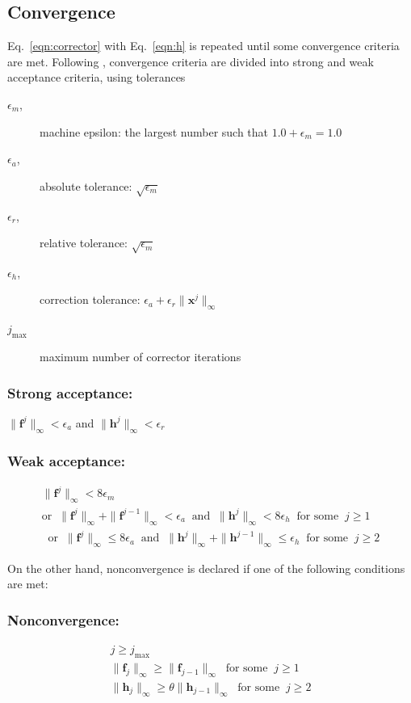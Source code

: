\documentclass[10pt,openany,twoside]{book}
\numberwithin{equation}{section}   %
\newcommand{\Vector}[1]{\boldsymbol{#1}}
\newcommand{\Eqn}[1]{Eq.\ \ref{#1}}
\begin{document}
\subsection{Convergence}
\Eqn{eqn:corrector} with \Eqn{eqn:h} is repeated until some convergence criteria
are met. Following \cite{rheinboldt1981numerical}, convergence criteria are
divided into strong and weak acceptance criteria, using tolerances
\begin{description}
	\item[$\epsilon_m$,] machine epsilon: the largest number such that $1.0+\epsilon_m = 1.0$
	\item[$\epsilon_a$,] absolute tolerance: $\sqrt{\epsilon_m}$
	\item[$\epsilon_r$,] relative tolerance: $\sqrt{\epsilon_m}$
	\item[$\epsilon_h$,] correction tolerance: $\epsilon_a + \epsilon_r \|\Vector{x}^j\|_\infty$
	\item[$j_{\text{max}}$] maximum number of corrector iterations
\end{description}
\subsubsection{Strong acceptance:}
		$\|\Vector{f}^j\|_\infty < \epsilon_a$ and
		$\|\Vector{h}^j\|_\infty < \epsilon_r$
\subsubsection{Weak acceptance:}
	\begin{gather}
			\|\Vector{f}^j\|_\infty < 8\epsilon_m \nonumber \\
		\text{or}\;\; \|\Vector{f}^j\|_\infty +
				\|\Vector{f}^{j-1}\|_\infty < \epsilon_a
				\;\;\text{and}\;\; \|\Vector{h}^j\|_\infty < 8\epsilon_h
					\;\;\text{for some}\;\; j \ge 1 \nonumber \\
		\;\;\text{or}\;\; \|\Vector{f}^j\|_\infty \le 8\epsilon_a \;\;\text{and}\;\;
				 \|\Vector{h}^j\|_\infty + \|\Vector{h}^{j-1}\|_\infty
					\le \epsilon_h \;\;\text{for some}\;\; j \ge 2 \nonumber
	\end{gather}

On the other hand, nonconvergence is declared if one of the following
conditions are met:
\subsubsection{Nonconvergence:}
	\begin{gather}
		j \ge j_{\text{max}} \nonumber \\
		\|\Vector{f}_j\|_\infty \ge \|\Vector{f}_{j-1}\|_\infty \;\;\text{for some}\;\;j \ge 1 \nonumber \\
		\|\Vector{h}_j\|_\infty \ge \theta\|\Vector{h}_{j-1}\|_\infty \;\;\text{for some}\;\;j \ge 2 \nonumber
	\end{gather}
\end{document}
